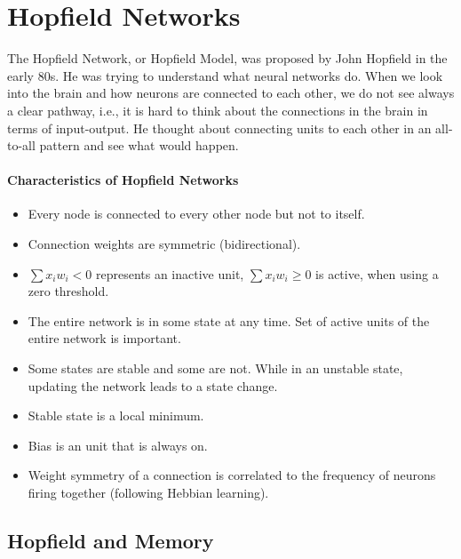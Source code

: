 \documentclass[main]{subfiles}
\begin{document}

\section{Hopfield Networks}

The Hopfield Network, or Hopfield Model, was proposed by John Hopfield in the early 80s.
He was trying to understand what neural networks do.
When we look into the brain and how neurons are connected to each other, we do not see always a clear pathway, i.e., it is hard to think about the connections in the brain in terms of input-output.
He thought about connecting units to each other in an all-to-all pattern and see what would happen.

\paragraph{Characteristics of Hopfield Networks}
\begin{itemize}[noitemsep,nolistsep]
	\item Every node is connected to every other node but not to itself.
	\item Connection weights are symmetric (bidirectional).
	\item $\sum x_i w_i < 0$ represents an inactive unit, $\sum x_i w_i \geq 0$ is active, when using a zero threshold.
	\item The entire network is in some state at any time. Set of active units of the entire network is important.
	\item Some states are stable and some are not. While in an unstable state, updating the network leads to a state change.
	\item Stable state is a local minimum.
	\item Bias is an unit that is always on.
	\item Weight symmetry of a connection is correlated to the frequency of neurons firing together (following Hebbian learning).
\end{itemize}

\subsection{Hopfield and Memory}
\end{document}

